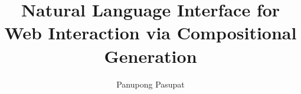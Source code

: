 \documentclass[12pt]{report}
\begin{document}
\title{Natural Language Interface for Web Interaction via Compositional Generation}
\author{Panupong Pasupat}
 
\beforepreface

\afterpreface



\appendix



\end{document}
